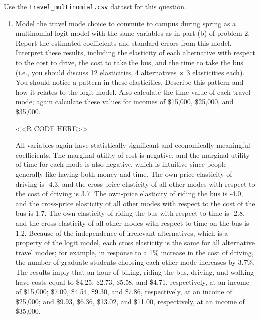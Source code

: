 \documentclass[11pt,letterpaper]{article}
\begin{document}
Use the \texttt{travel\_multinomial.csv} dataset for this question.

\begin{enumerate}[label=\alph*., leftmargin=*]
	\item Model the travel mode choice to commute to campus during spring as a multinomial logit model with the same variables as in part (b) of problem 2. Report the estimated coefficients and standard errors from this model. Interpret these results, including the elasticity of each alternative with respect to the cost to drive, the cost to take the bus, and the time to take the bus (i.e., you should discuss 12 elasticities, 4 alternatives $\times$ 3 elasticities each). You should notice a pattern in these elasticities. Describe this pattern and how it relates to the logit model. Also calculate the time-value of each travel mode; again calculate these values for incomes of \$15,000, \$25,000, and \$35,000.

	<<R CODE HERE>>

	All variables again have statistically significant and economically meaningful coefficients. The marginal utility of cost is negative, and the marginal utility of time for each mode is also negative, which is intuitive since people generally like having both money and time. The own-price elasticity of driving is -4.3, and the cross-price elasticity of all other modes with respect to the cost of driving is 3.7. The own-price elasticity of riding the bus is -4.0, and the cross-price elasticity of all other modes with respect to the cost of the bus is 1.7. The own elasticity of riding the bus with respect to time is -2.8, and the cross elasticity of all other modes with respect to time on the bus is 1.2. Because of the independence of irrelevant alternatives, which is a property of the logit model, each cross elasticity is the same for all alternative travel modes; for example, in response to a 1\% increase in the cost of driving, the number of graduate students choosing each other mode increases by 3.7\%. The results imply that an hour of biking, riding the bus, driving, and walking have costs equal to \$4.25, \$2.73, \$5.58, and \$4.71, respectively, at an income of \$15,000; \$7.09, \$4.54, \$9.30, and \$7.86, respectively, at an income of \$25,000; and \$9.93, \$6.36, \$13.02, and \$11.00, respectively, at an income of \$35,000.


\end{enumerate}
\end{document}
